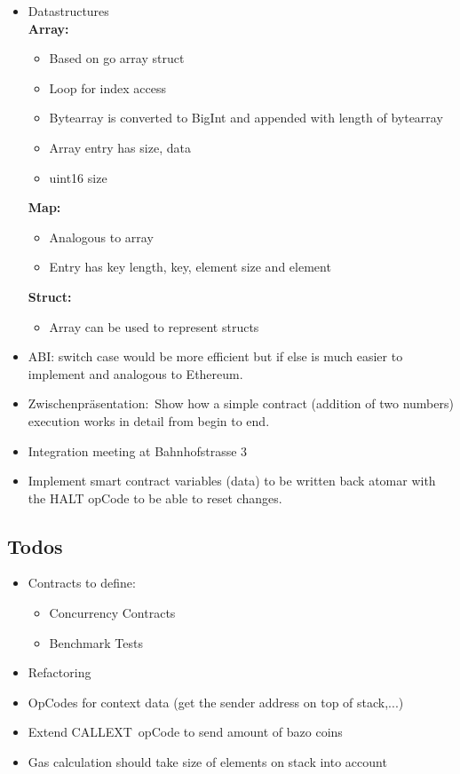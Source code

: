 \begin{itemize}
\item
  Datastructures\\
  \textbf{Array:}

  \begin{itemize}
  \item
    Based on go array struct
  \item
    Loop for index access
  \item
    Bytearray is converted to BigInt and appended with length of
    bytearray
  \item
    Array entry has size, data
  \item
    uint16 size
  \end{itemize}

  \textbf{Map:}

  \begin{itemize}
  \item
    Analogous to array
  \item
    Entry has key length, key, element size and element
  \end{itemize}

  \textbf{Struct:}

  \begin{itemize}
  \item
    Array can be used to represent structs
  \end{itemize}
\item
  ABI: switch case would be more efficient but if else is much easier to
  implement and analogous to Ethereum.
\item
  Zwischenpräsentation:~Show how a simple contract (addition of two
  numbers) execution works in detail from begin to end.
\item
  Integration meeting at Bahnhofstrasse 3
\item
  Implement smart contract variables (data) to be written back atomar
  with the HALT opCode to be able to reset changes.
\end{itemize}

\subsection{Todos}

\begin{itemize}
\item
  Contracts to define:

  \begin{itemize}
  \item
    Concurrency Contracts
  \item
    Benchmark Tests
  \end{itemize}
\item
  Refactoring
\item
  OpCodes for context data (get the sender address on top of stack,...)
\item
  Extend CALLEXT~opCode to send amount of bazo coins
\item
  Gas calculation should take size of elements on stack into account
\end{itemize}

